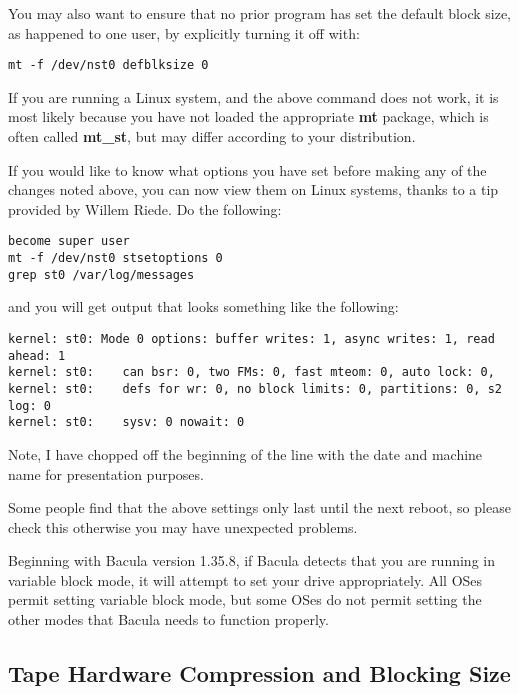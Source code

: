 You may also want to ensure that no prior program has set the default block
size, as happened to one user, by explicitly turning it off with:

\footnotesize
\begin{verbatim}
mt -f /dev/nst0 defblksize 0
\end{verbatim}
\normalsize

If you are running a Linux
system, and the above command does not work, it is most likely because you
have not loaded the appropriate {\bf mt} package, which is often called
{\bf mt\_st}, but may differ according to your distribution.

If you would like to know what options you have set before making any of the
changes noted above, you can now view them on Linux systems, thanks to a tip
provided by Willem Riede. Do the following:

\footnotesize
\begin{verbatim}
become super user
mt -f /dev/nst0 stsetoptions 0
grep st0 /var/log/messages
\end{verbatim}
\normalsize

and you will get output that looks something like the following:

\footnotesize
\begin{verbatim}
kernel: st0: Mode 0 options: buffer writes: 1, async writes: 1, read ahead: 1
kernel: st0:    can bsr: 0, two FMs: 0, fast mteom: 0, auto lock: 0,
kernel: st0:    defs for wr: 0, no block limits: 0, partitions: 0, s2 log: 0
kernel: st0:    sysv: 0 nowait: 0
\end{verbatim}
\normalsize

Note, I have chopped off the beginning of the line with the date and machine
name for presentation purposes.

Some people find that the above settings only last until the next reboot, so
please check this otherwise you may have unexpected problems.

Beginning with Bacula version 1.35.8, if Bacula detects that you are running
in variable block mode, it will attempt to set your drive appropriately. All
OSes permit setting variable block mode, but some OSes do not permit setting
the other modes that Bacula needs to function properly.

\label{compression}
\subsection{Tape Hardware Compression and Blocking Size}

